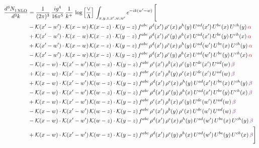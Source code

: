 \documentclass[9pt]{article}
\numberwithin{equation}{section}
\begin{document}
\begin{align}
  \frac{d^{3}N_{1\,\rm NLO}^{\rm}}{d^{3}k}  & = \frac{1}{(2\pi)^{3}}\, \frac{ig^{4}}{16\pi^{5}}\, \frac{1}{k^{+}}\, \log{\left[\frac{\vee}{\Lambda}\right]}\, \int_{x,y,z,x^{\prime},w,w^{\prime}}e^{-ik(w^{\prime}-w)}\, \Bigg[\notag \\ & -\mathcal{K}(x'-w')\cdot\mathcal{K}(x-w)\,\mathcal{K}(x-z)\cdot\mathcal{K}(y-z)\, f^{abc}\,\rho^{d}(x')\,\rho^{e}(x)\,\rho^{h}(y)\,U^{ad}(x')\,U^{be}(x)\,U^{ch}(y)\,{\color{red}\alpha}\notag\\
&+\mathcal{K}(x'-w')\cdot\mathcal{K}(x-w)\,\mathcal{K}(x-z)\cdot\mathcal{K}(y-z)\, f^{abc}\,\rho^{d}(x')\,\rho^{e}(y)\,\rho^{h}(x)\,U^{ad}(x')\,U^{be}(y)\,U^{ch}(x)\,{\color{red}\alpha}\notag\\ & +\mathcal{K}(x'-w')\cdot\mathcal{K}(x-w)\,\mathcal{K}(x-z)\cdot\mathcal{K}(y-z)\, f^{abc}\,\rho^{d}(x')\,\rho^{e}(x)\,\rho^{h}(y)\,U^{ad}(w')\,U^{be}(x)\,U^{ch}(y)\,{\color{red}\alpha}\notag\\ & -\mathcal{K}(x'-w')\cdot\mathcal{K}(x-w)\,\mathcal{K}(x-z)\cdot\mathcal{K}(y-z)\, f^{abc}\,\rho^{d}(x')\,\rho^{e}(y)\,\rho^{h}(x)\,U^{ad}(w')\,U^{be}(y)\,U^{ch}(x)\,{\color{red}\alpha}\notag\\ & - \mathcal{K}(x-w) \cdot \mathcal{K}(x'-w')\, \mathcal{K}(w-z)\cdot \mathcal{K}(y-z)\, f^{abc}\, \rho^{e}(x')\,\rho^{b}(x)\,\rho^{c}(y)\,U^{de}(x')\,U^{ad}(w)\,{\color{violet} \beta} \notag \\ &  +  \mathcal{K}(x-w) \cdot \mathcal{K}(x'-w')\, \mathcal{K}(w-z)\cdot \mathcal{K}(y-z)\, f^{abc}\, \rho^{e}(x')\,\rho^{b}(y)\,\rho^{c}(x)\,U^{de}(x')\,U^{ad}(w)\,{\color{violet} \beta} \notag \\ & + \mathcal{K}(x-w) \cdot \mathcal{K}(x'-w')\, \mathcal{K}(w-z)\cdot \mathcal{K}(y-z)\, f^{abc}\, \rho^{d}(x')\,\rho^{e}(x)\,\rho^{h}(y)\,U^{ad}(x')\,U^{be}(x)\,U^{ch}(y)\, {\color{violet} \beta} \notag \\ & - \mathcal{K}(x-w) \cdot \mathcal{K}(x'-w')\, \mathcal{K}(w-z)\cdot \mathcal{K}(y-z)\, f^{abc}\, \rho^{d}(x')\,\rho^{e}(y)\,\rho^{h}(x)\,U^{ad}(x')\,U^{be}(y)\,U^{ch}(x)\, {\color{violet} \beta} \notag \\ & + \mathcal{K}(x-w) \cdot \mathcal{K}(x'-w')\, \mathcal{K}(w-z)\cdot \mathcal{K}(y-z)\, f^{abc}\, \rho^{e}(x')\,\rho^{b}(x)\,\rho^{c}(y)\,U^{de}(w')\,U^{ad}(w)\,{\color{violet} \beta} \notag \\ & - \mathcal{K}(x-w) \cdot \mathcal{K}(x'-w')\, \mathcal{K}(w-z)\cdot \mathcal{K}(y-z)\, f^{abc}\, \rho^{e}(x')\,\rho^{b}(y)\,\rho^{c}(x)\,U^{de}(w')\,U^{ad}(w)\, {\color{violet} \beta} \notag \\ & - \mathcal{K}(x-w) \cdot \mathcal{K}(x'-w')\, \mathcal{K}(w-z)\cdot \mathcal{K}(y-z)\, f^{abc}\, \rho^{d}(x')\,\rho^{e}(x)\,\rho^{h}(y)\,U^{ad}(w')\,U^{be}(x)\,U^{ch}(y)\, {\color{violet} \beta} \notag \\ & + \mathcal{K}(x-w) \cdot \mathcal{K}(x'-w')\, \mathcal{K}(w-z)\cdot \mathcal{K}(y-z)\, f^{abc}\, \rho^{d}(x')\,\rho^{e}(y)\,\rho^{h}(x)\,U^{ad}(w')\,U^{be}(y)\,U^{ch}(x)\, {\color{violet} \beta} \Bigg]
\end{align}
\end{document}
